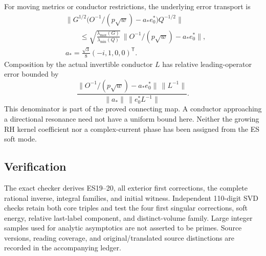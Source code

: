 For moving metrics or conductor restrictions, the underlying error transport is
\[
\begin{aligned}
&\bigl\|G^{1/2}\bigl(O^{-1}/(p\sqrt w)-a_*e_0^*\bigr)Q^{-1/2}\bigr\|\\
&\qquad\le
\sqrt{\frac{\lambda_{\max}(G)}{\lambda_{\min}(Q)}}\,
\bigl\|O^{-1}/(p\sqrt w)-a_*e_0^*\bigr\|,\\
&a_*=\frac{\sqrt3}{8}(-i,1,0,0)^{\mathsf T}.
\end{aligned}
\tag{ES36}
\] Composition by the actual invertible conductor \(L\) has relative leading-operator error bounded by
\[
\frac{
  \bigl\|O^{-1}/(p\sqrt w)-a_*e_0^*\bigr\|\,
  \|L^{-1}\|
}{
  \|a_*\|\,\|e_0^*L^{-1}\|
}.
\tag{ES37}
\] This denominator is part of the proved connecting map. A conductor approaching a directional resonance need not have a uniform bound here. Neither the growing RH kernel coefficient nor a complex-current phase has been assigned from the ES soft mode.

\subsection{Verification}\label{verification}

The exact checker derives ES19--20, all exterior first corrections, the complete rational inverse, integral families, and initial witness. Independent 110-digit SVD checks retain both core triples and test the four first singular corrections, soft energy, relative last-label component, and distinct-volume family. Large integer samples used for analytic asymptotics are not asserted to be primes. Source versions, reading coverage, and original/translated source distinctions are recorded in the accompanying ledger.
